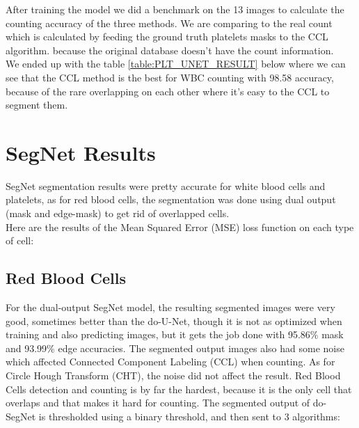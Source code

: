 After training the model we did a benchmark on the 13 images to calculate the counting accuracy of the three methods.
We are comparing to the real count which is calculated by feeding the ground truth platelets masks to  the CCL algorithm. because the original database doesn't have the count information.\\
We ended up with the table \ref{table:PLT_UNET_RESULT} below where we can see that the CCL method is the best for WBC counting with 98.58 accuracy, because of the rare overlapping on each other where it’s easy to the CCL to segment them.



\section{SegNet Results}
\hspace{\parindent}
SegNet segmentation results were pretty accurate for white blood cells and platelets, as for red blood cells, the segmentation was done using dual output (mask and edge-mask) to get rid of overlapped cells.\\
Here are the results of the Mean Squared Error (MSE) loss function on each type of cell:



\subsection{Red Blood Cells}
\hspace{\parindent}
For the dual-output SegNet model, the resulting segmented images were very good, sometimes better than the do-U-Net, though it is not as optimized when training and also predicting images, but it gets the job done with 95.86\% mask and 93.99\% edge accuracies. The segmented output images also had some noise which affected Connected Component Labeling (CCL) when counting.
As for Circle Hough Transform (CHT), the noise did not affect the result.
Red Blood Cells detection and counting is by far the hardest, because it is the only cell that overlaps and that makes it hard for counting.
The segmented output of do-SegNet is thresholded using a binary threshold, and then sent to 3 algorithms:

